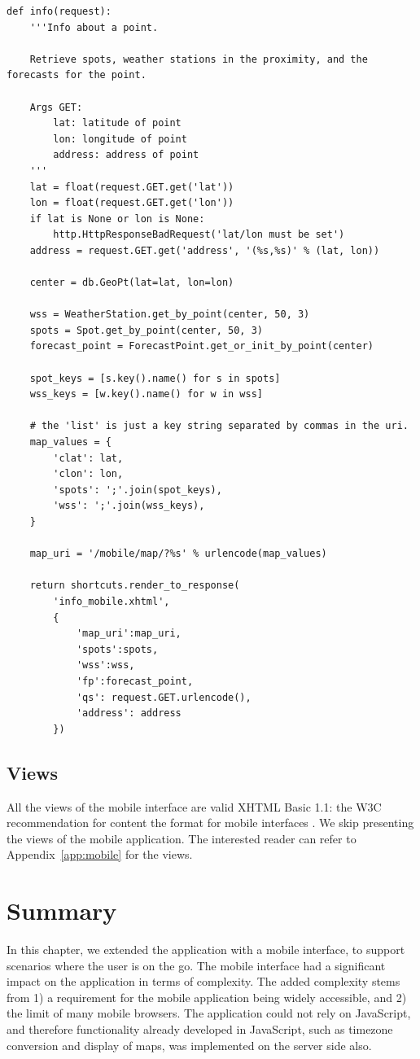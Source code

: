 \begin{lstlisting}
def info(request):
    '''Info about a point.
    
    Retrieve spots, weather stations in the proximity, and the forecasts for the point.
    
    Args GET:
        lat: latitude of point
        lon: longitude of point
        address: address of point
    '''
    lat = float(request.GET.get('lat'))
    lon = float(request.GET.get('lon'))
    if lat is None or lon is None:
        http.HttpResponseBadRequest('lat/lon must be set')
    address = request.GET.get('address', '(%s,%s)' % (lat, lon))
    
    center = db.GeoPt(lat=lat, lon=lon)
    
    wss = WeatherStation.get_by_point(center, 50, 3)
    spots = Spot.get_by_point(center, 50, 3)
    forecast_point = ForecastPoint.get_or_init_by_point(center)
    
    spot_keys = [s.key().name() for s in spots]
    wss_keys = [w.key().name() for w in wss]
    
    # the 'list' is just a key string separated by commas in the uri.
    map_values = {
        'clat': lat,
        'clon': lon,
        'spots': ';'.join(spot_keys),
        'wss': ';'.join(wss_keys),
    }
    
    map_uri = '/mobile/map/?%s' % urlencode(map_values)
    
    return shortcuts.render_to_response(
        'info_mobile.xhtml',
        {
            'map_uri':map_uri,
            'spots':spots,
            'wss':wss,
            'fp':forecast_point,
            'qs': request.GET.urlencode(),
            'address': address
        })
\end{lstlisting}


\subsection{Views}
All the views of the mobile interface are valid XHTML Basic 1.1: the W3C
recommendation for content the format for mobile interfaces
\citep{w3c:mobile}. We skip presenting the views of the mobile application. The
interested reader can refer to Appendix~\ref{app:mobile} for the views.

\section{Summary}
In this chapter, we extended the application with a mobile interface, to support
scenarios where the user is on the go. The mobile interface had a significant
impact on the application in terms of complexity. The added complexity stems from
1) a requirement for the mobile application being widely accessible, and 2) the
limit of many mobile browsers. The application could not rely on JavaScript, and
therefore functionality already developed in JavaScript, such as timezone
conversion and display of maps, was implemented on the server side also.
